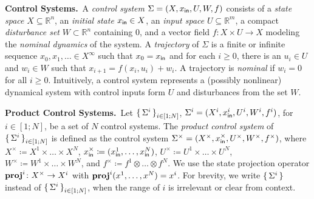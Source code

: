 

 
\smallskip
\noindent\textbf{Control Systems.}\
A \emph{control system} $\Sigma = (X, x_{\mathsf{in}}, U, W, f)$
consists of a \emph{state space} $X\subseteq \mathbb{R}^n$,
an \emph{initial state} $x_{\mathsf{in}}\in X$,
an \emph{input space} $U\subseteq\mathbb{R}^m$, 
a compact \emph{disturbance set} $W\subset \mathbb{R}^n$ containing $0$, and a vector field $f:X\times U\rightarrow X$ modeling the \emph{nominal dynamics} of the system. 
A \emph{trajectory} of $\Sigma$ is a finite or infinite sequence $x_0, x_1, \ldots \in X^\infty$
such that $x_0 = x_{\mathsf{in}}$ and for each $i\geq 0$, there is an $u_i\in U$ and $w_i \in W$ such that
$x_{i+1} = f(x_i, u_i) + w_i$.
A trajectory is \emph{nominal} if $w_i = 0$ for all $i\geq 0$.
Intuitively, a control system represents a (possibly nonlinear) dynamical system with control inputs form $U$
and disturbances from the set $W$.

\smallskip
\noindent\textbf{Product Control Systems.}\
Let $\set{\Sigma^i}_{i\in [1;N]}$, 
$\Sigma^i=(X^i,x_{\mathsf{in}}^i,U^i,W^i,f^i)$, for $i \in [1;N]$, be a set of $N$ control systems. 
The \emph{product control system} of $\set{\Sigma^i}_{i\in [1;N]}$ is defined as the control system 
$\Sigma^\times = (X^\times, x_{\mathsf{in}}^\times, U^\times, W^\times, f^\times)$,
where $X^\times \coloneqq X^1 \times \ldots \times X^N$, 
$x_{\mathsf{in}}^\times \coloneqq (x_{\mathsf{in}}^1, \ldots, x_{\mathsf{in}}^N)$,
$U^\times \coloneqq U^1 \times \ldots \times U^N$, 
$W^\times \coloneqq W^1 \times \ldots \times W^N$, 
and $f^\times\coloneqq f^1\otimes \ldots \otimes f^N$.
We use the state projection operator $\mathbf{proj}^{i}\colon X^\times\to X^i$ with $\mathbf{proj}^{i} (x^1,\ldots,x^N) = x^i$. 
For brevity, we write $\set{\Sigma^i}$ instead of $\set{\Sigma^i}_{i\in [1;N]}$, when the range of $i$ is irrelevant or clear from context.

